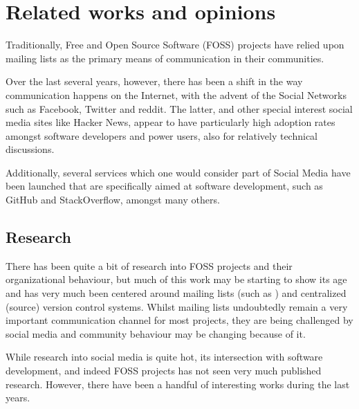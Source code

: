 \documentclass[a4paper,11pt]{article} %
\begin{document}
\section{Related works and opinions}



Traditionally, Free and Open Source Software (FOSS) projects have
relied upon mailing lists as the primary means of communication in
their communities. %

Over the last several years, however, there has been a shift in the
way communication happens on the Internet, with the advent of the
Social Networks such as Facebook, Twitter and reddit. The latter, and
other special interest social media sites like Hacker News, appear to
have particularly high adoption rates amongst software developers and
power users, also for relatively technical discussions.

Additionally, several services which one would consider part of Social
Media have been launched that are specifically aimed at software
development, such as GitHub and StackOverflow, amongst many others.

\subsection{Research}
There has been quite a bit of research into FOSS projects and their
organizational behaviour, but much of this work may be starting to
show its age and has very much been centered around mailing lists
(such as \cite{Oezbek10Cancer, singh2011network}) and centralized (source) version
control systems. Whilst mailing lists undoubtedly remain a very
important communication channel for most projects, they are being
challenged by social media and community behaviour may be changing
because of it.

While research into social media is quite hot, its intersection with
software development, and indeed FOSS projects has not seen very much
published research. However, there have been a handful of interesting
works during the last years.
\end{document}
